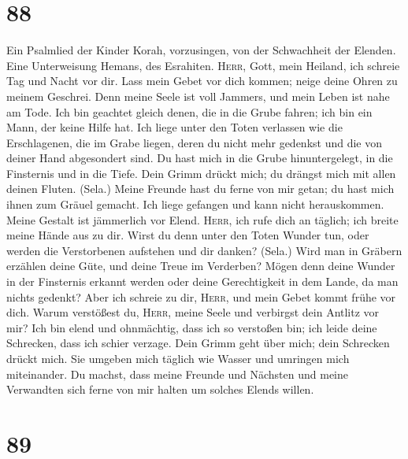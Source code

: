 \hypertarget{section-87}{%
\section{88}\label{section-87}}

 Ein Psalmlied der Kinder Korah, vorzusingen, von der
Schwachheit der Elenden. Eine Unterweisung Hemans, des Esrahiten.
 \textsc{Herr}, Gott, mein Heiland, ich schreie Tag und
Nacht vor dir.  Lass mein Gebet vor dich kommen; neige
deine Ohren zu meinem Geschrei.  Denn meine Seele ist voll
Jammers, und mein Leben ist nahe am Tode.  Ich bin
geachtet gleich denen, die in die Grube fahren; ich bin ein Mann, der
keine Hilfe hat.  Ich liege unter den Toten verlassen wie
die Erschlagenen, die im Grabe liegen, deren du nicht mehr gedenkst und
die von deiner Hand abgesondert sind.  Du hast mich in die
Grube hinuntergelegt, in die Finsternis und in die Tiefe. 
Dein Grimm drückt mich; du drängst mich mit allen deinen Fluten. (Sela.)
 Meine Freunde hast du ferne von mir getan; du hast mich
ihnen zum Gräuel gemacht. Ich liege gefangen und kann nicht
herauskommen.  Meine Gestalt ist jämmerlich vor Elend.
\textsc{Herr}, ich rufe dich an täglich; ich breite meine Hände aus zu
dir.  Wirst du denn unter den Toten Wunder tun, oder
werden die Verstorbenen aufstehen und dir danken? (Sela.)
 Wird man in Gräbern erzählen deine Güte, und deine Treue
im Verderben?  Mögen denn deine Wunder in der Finsternis
erkannt werden oder deine Gerechtigkeit in dem Lande, da man nichts
gedenkt?  Aber ich schreie zu dir, \textsc{Herr}, und
mein Gebet kommt frühe vor dich.  Warum verstößest du,
\textsc{Herr}, meine Seele und verbirgst dein Antlitz vor mir?
 Ich bin elend und ohnmächtig, dass ich so verstoßen bin;
ich leide deine Schrecken, dass ich schier verzage.  Dein
Grimm geht über mich; dein Schrecken drückt mich.  Sie
umgeben mich täglich wie Wasser und umringen mich miteinander.
 Du machst, dass meine Freunde und Nächsten und meine
Verwandten sich ferne von mir halten um solches Elends willen.

\hypertarget{section-88}{%
\section{89}\label{section-88}}

